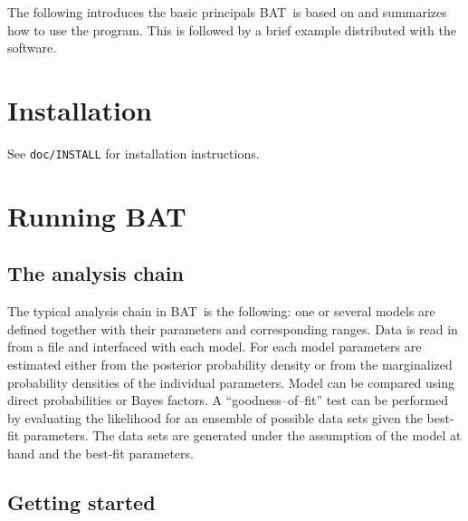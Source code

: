 \documentclass[11pt, a4paper]{article}
\newcommand{\bat}{{\sc BAT}}
\begin{document}
The following introduces the basic principals \bat\ is based on
and summarizes how to use the program. This is followed by a brief
example distributed with the software.

\section{Installation}
\label{section:installation}

See \verb|doc/INSTALL| for installation instructions.


\section{Running \bat}
\label{section:running}

\subsection{The analysis chain} 
\label{subsection:chain}

The typical analysis chain in \bat\ is the following: one or several
models are defined together with their parameters and corresponding
ranges. Data is read in from a file and interfaced with each
model. For each model parameters are estimated either from the
posterior probability density or from the marginalized probability
densities of the individual parameters. Model can be compared using
direct probabilities or Bayes factors. A ``goodness--of--fit'' test
can be performed by evaluating the likelihood for an ensemble of
possible data sets given the best-fit parameters. The data sets are
generated under the assumption of the model at hand and the best-fit
parameters. \\


\subsection{Getting started} 
\label{subsection:start}
\end{document}
